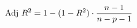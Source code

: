 \documentclass[preview]{standalone}
\begin{document}
\begin{align*}
\special{dvisvgm:raw <g id='unique000'>}\text{Adj } R^2 = 1 - (1 - R^2) \cdot \frac{n-1}{n-p-1}\special{dvisvgm:raw </g>}
\end{align*}
\end{document}
